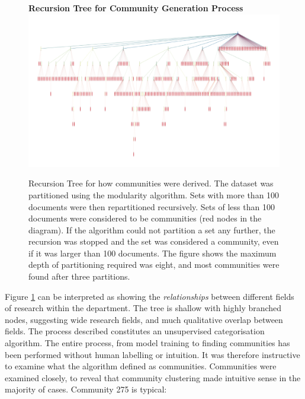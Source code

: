 \begin{center}
\begin{figure}[H]
  \centering
  \textbf{Recursion Tree for Community Generation Process}
    \includegraphics[width=\textwidth]{Analysis/comms.png}
    \caption[Recursion Tree for Document Community Generation]{Recursion Tree for how communities were derived. The dataset was partitioned using the modularity algorithm. Sets with more than 100 documents were then repartitioned recursively. Sets of less than 100 documents were considered to be communities (red nodes in the diagram). If the algorithm could not partition a set any further, the recursion was stopped and the set was considered a community, even if it was larger than 100 documents.  The figure shows the maximum depth of partitioning required was eight, and most communities were found after three partitions.}
    \label{fig:COMMTREE}

\end{figure} 
\end{center}
Figure \ref{fig:COMMTREE} can be interpreted as showing the \emph{relationships} between different fields of research within the department. The tree is shallow with highly branched nodes, suggesting wide research fields, and much qualitative overlap between fields.
The process described constitutes an unsupervised categorisation algorithm. The entire process, from model training to finding communities has been performed without human labelling or intuition. It was therefore instructive to examine what the algorithm defined as communities.
Communities were examined closely, to reveal that community clustering made intuitive sense in the majority of cases. Community 275 is typical:
